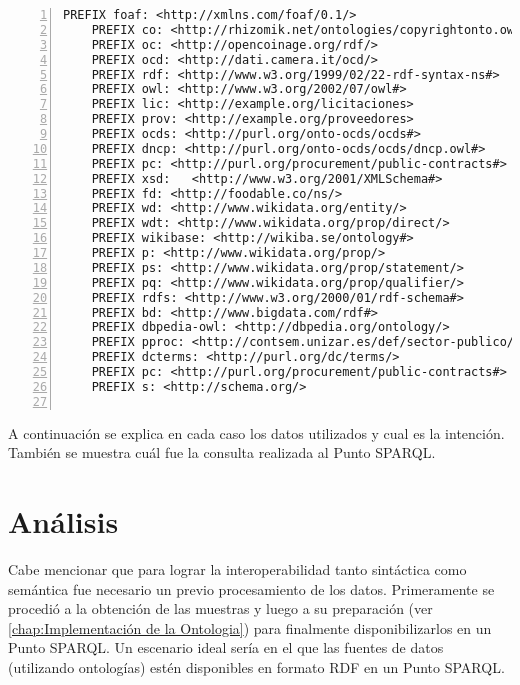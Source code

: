 \noindent\begin{minipage}[t]{\textwidth}
\begin{lstlisting}[captionpos=b, caption={Prefijos de las consultas SPARQL}, label={lst:prefijos},  numbers=left,  numberstyle=\tiny\color{mygray},frame=single]
    PREFIX foaf: <http://xmlns.com/foaf/0.1/>
    PREFIX co: <http://rhizomik.net/ontologies/copyrightonto.owl#>
    PREFIX oc: <http://opencoinage.org/rdf/>
    PREFIX ocd: <http://dati.camera.it/ocd/>
    PREFIX rdf: <http://www.w3.org/1999/02/22-rdf-syntax-ns#>
    PREFIX owl: <http://www.w3.org/2002/07/owl#>
    PREFIX lic: <http://example.org/licitaciones>
    PREFIX prov: <http://example.org/proveedores>
    PREFIX ocds: <http://purl.org/onto-ocds/ocds#>
    PREFIX dncp: <http://purl.org/onto-ocds/ocds/dncp.owl#>
    PREFIX pc: <http://purl.org/procurement/public-contracts#>
    PREFIX xsd:   <http://www.w3.org/2001/XMLSchema#>
    PREFIX fd: <http://foodable.co/ns/>
    PREFIX wd: <http://www.wikidata.org/entity/>
    PREFIX wdt: <http://www.wikidata.org/prop/direct/>
    PREFIX wikibase: <http://wikiba.se/ontology#>
    PREFIX p: <http://www.wikidata.org/prop/>
    PREFIX ps: <http://www.wikidata.org/prop/statement/>
    PREFIX pq: <http://www.wikidata.org/prop/qualifier/>
    PREFIX rdfs: <http://www.w3.org/2000/01/rdf-schema#>
    PREFIX bd: <http://www.bigdata.com/rdf#>
    PREFIX dbpedia-owl: <http://dbpedia.org/ontology/>
    PREFIX pproc: <http://contsem.unizar.es/def/sector-publico/pproc#> 
    PREFIX dcterms: <http://purl.org/dc/terms/> 
    PREFIX pc: <http://purl.org/procurement/public-contracts#> 
    PREFIX s: <http://schema.org/> 
    
 \end{lstlisting}
\end{minipage}

 A continuación se explica en cada caso los datos utilizados y cual es la intención. También se muestra cuál fue la consulta realizada al Punto SPARQL.








\section{Análisis}
Cabe mencionar que para lograr la interoperabilidad tanto sintáctica como semántica fue necesario un previo procesamiento de los datos. Primeramente se procedió a la obtención de las muestras y luego a su preparación (ver \ref{chap:Implementación de la Ontologia}) para finalmente disponibilizarlos en un Punto SPARQL. Un escenario ideal sería en el que las fuentes de datos (utilizando ontologías) estén disponibles en formato RDF en un Punto SPARQL.

